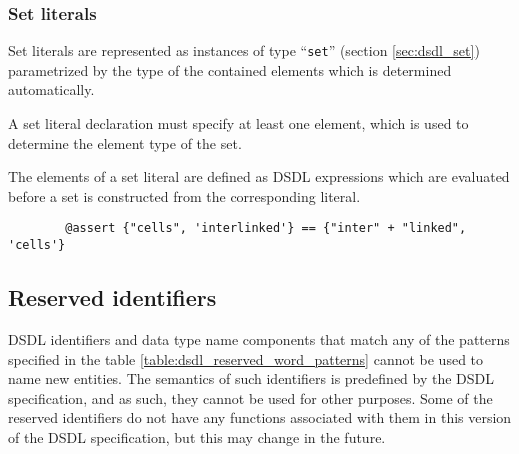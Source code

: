 \subsubsection{Set literals}

Set literals are represented as instances of type ``\verb|set|'' (section \ref{sec:dsdl_set})
parametrized by the type of the contained elements which is determined automatically.

A set literal declaration must specify at least one element,
which is used to determine the element type of the set.

The elements of a set literal are defined as DSDL expressions which are evaluated before a set is constructed
from the corresponding literal.

\begin{remark}
    \begin{verbatim}
        @assert {"cells", 'interlinked'} == {"inter" + "linked", 'cells'}
    \end{verbatim}
\end{remark}

\subsection{Reserved identifiers}\label{sec:dsdl_reserved_identifiers}

DSDL identifiers and data type name components that match any of the
patterns specified in the table \ref{table:dsdl_reserved_word_patterns}
cannot be used to name new entities.
The semantics of such identifiers is predefined by the DSDL specification,
and as such, they cannot be used for other purposes.
Some of the reserved identifiers do not have any functions associated with them
in this version of the DSDL specification, but this may change in the future.

